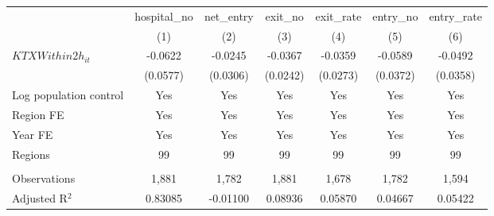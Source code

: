 \begingroup
\centering
\begin{tabular}{lcccccc}
   \toprule
                          & hospital\_no  & net\_entry  & exit\_no  & exit\_rate  & entry\_no  & entry\_rate \\    
                          & (1)           & (2)         & (3)       & (4)         & (5)        & (6)\\  
   \midrule 
   $KTXWithin2h_{it}$     & -0.0622       & -0.0245     & -0.0367   & -0.0359     & -0.0589    & -0.0492\\   
                          & (0.0577)      & (0.0306)    & (0.0242)  & (0.0273)    & (0.0372)   & (0.0358)\\   
   Log population control & Yes           & Yes         & Yes       & Yes         & Yes        & Yes\\  
   Region FE              & Yes           & Yes         & Yes       & Yes         & Yes        & Yes\\  
   Year FE                & Yes           & Yes         & Yes       & Yes         & Yes        & Yes\\  
   Regions                & 99            & 99          & 99        & 99          & 99         & 99\\  
    \\
   Observations           & 1,881         & 1,782       & 1,881     & 1,678       & 1,782      & 1,594\\  
   Adjusted R$^2$         & 0.83085       & -0.01100    & 0.08936   & 0.05870     & 0.04667    & 0.05422\\  
   \bottomrule
\end{tabular}
\par\endgroup
